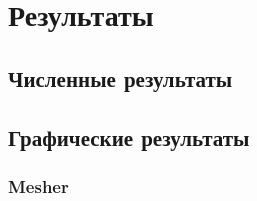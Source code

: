 \chapter{Результаты}\label{ch:results}

\section*{Численные результаты}

\section*{Графические результаты}

\subsection*{Mesher}
